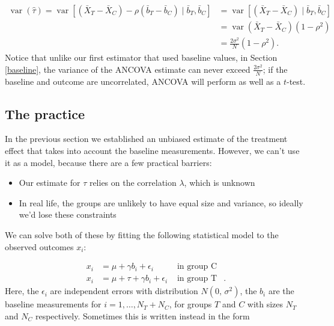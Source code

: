 \documentclass[
  openany]{book}
\providecommand{\tightlist}{%
  \setlength{\itemsep}{0pt}\setlength{\parskip}{0pt}}
\theoremstyle{definition}
\theoremstyle{definition}
\theoremstyle{definition}
\theoremstyle{definition}
\theoremstyle{remark}
\begin{document}
\[
\begin{aligned}
\operatorname{var}\left(\hat{\tau}\right) = \operatorname{var}\left[\left(\bar{X}_T - \bar{X}_C\right) - \rho\left(\bar{b}_T - \bar{b}_C\right)\mid{\bar{b}_T,\bar{b}_C}\right] &= \operatorname{var}\left[\left(\bar{X}_T - \bar{X}_C\right) \mid{\bar{b}_T,\bar{b}_C}\right]\\
& = \operatorname{var}\left(\bar{X}_T - \bar{X}_C\right)\left(1-\rho^2\right)\\
& = \frac{2\sigma^2}{N}\left(1-\rho^2\right).
\end{aligned}
\]
Notice that unlike our first estimator that used baseline values, in Section \ref{baseline}, the variance of the ANCOVA estimate can never exceed \(\frac{2\sigma^2}{N}\); if the baseline and outcome are uncorrelated, ANCOVA will perform as well as a \(t\)-test.

\hypertarget{the-practice}{%
\subsection{The practice}\label{the-practice}}

In the previous section we established an unbiased estimate of the treatment effect that takes into account the baseline measurements. However, we can't use it as a model, because there are a few practical barriers:

\begin{itemize}
\tightlist
\item
  Our estimate for \(\tau\) relies on the correlation \(\lambda\), which is unknown
\item
  In real life, the groups are unlikely to have equal size and variance, so ideally we'd lose these constraints
\end{itemize}

We can solve both of these by fitting the following statistical model to the observed outcomes \(x_i\):

\[
\begin{aligned}
x_i & = \mu + \gamma b_i + \epsilon_i & \text{ in group C}\\
x_i & = \mu + \tau + \gamma b_i + \epsilon_i & \text{ in group T}&.
\end{aligned}
\]
Here, the \(\epsilon_i\) are independent errors with distribution \(N\left(0,\,\sigma^2\right)\), the \(b_i\) are the baseline measurements for \(i=1,\ldots,N_T+N_C\), for groups \(T\) and \(C\) with sizes \(N_T\) and \(N_C\) respectively. Sometimes this is written instead in the form
\end{document}
